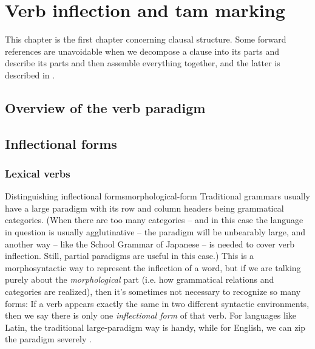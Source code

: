 \documentclass[UTF8, a4paper, oneside, scheme=plain]{ctexrep}
\newcommand*{\citesec}[1]{\S~{#1}}
\newcommand*{\citechap}[1]{Ch~{#1}}
\newcommand*{\citechapsec}[2]{\citechap{#1}.\citesec{#2}}
\begin{document}
\chapter{Verb inflection and \acs{tam} marking}

This chapter is the first chapter concerning clausal structure.
Some forward references are unavoidable when we decompose a clause into its parts
and describe its parts and then assemble everything together,
and the latter is described in .

\section{Overview of the verb paradigm}

\section{Inflectional forms}\label{sec:verb-forms}

\subsection{Lexical verbs}

\begin{theorybox}{Distinguishing inflectional forms}{morphological-form}
    Traditional grammars usually have a large paradigm
    with its row and column headers being grammatical categories.
    (When there are too many categories 
    -- and in this case the language in question is usually agglutinative -- 
    the paradigm will be unbearably large, 
    and another way -- like the School Grammar of Japanese -- is needed to cover verb inflection.
    Still, partial paradigms are useful in this case.) 
    This is a morphosyntactic way to represent the inflection of a word, 
    but if we are talking purely about the \emph{morphological} part
    (i.e. how grammatical relations and categories are realized),
    then it's sometimes not necessary to recognize so many forms:
    If a verb appears exactly the same in two different syntactic environments,
    then we say there is only one \emph{inflectional form} of that verb.
    For languages like Latin, 
    the traditional large-paradigm way is handy,
    while for English, we can zip the paradigm severely \citep[\citechapsec{3}{1.2}]{cgel}.
\end{theorybox}
\end{document}
